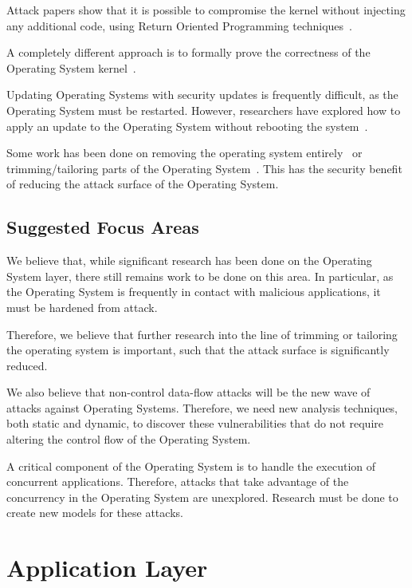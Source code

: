 \documentclass[11pt,letterpaper]{article}
\begin{document}
Attack papers show that it is possible to compromise the kernel
without injecting any additional code, using Return Oriented
Programming techniques~\cite{Hund2009}.

A completely different approach is to formally prove the correctness
of the Operating System kernel~\cite{Klein2009}.

Updating Operating Systems with security updates is frequently
difficult, as the Operating System must be restarted. However,
researchers have explored how to apply an update to the Operating
System without rebooting the system~\cite{Arnold2009}.

Some work has been done on removing the operating system
entirely~\cite{Madhavapeddy2010} or trimming/tailoring parts of the
Operating System~\cite{Kurmus2011, Madhavapeddy2013, Howell2013,
  Kurmus2013, Kurmus2014}. This has the security benefit of reducing
the attack surface of the Operating System.

\subsection{Suggested Focus Areas}

We believe that, while significant research has been done on the
Operating System layer, there still remains work to be done on this
area. In particular, as the Operating System is frequently in contact
with malicious applications, it must be hardened from attack.

Therefore, we believe that further research into the line of trimming
or tailoring the operating system is important, such that the attack
surface is significantly reduced.

We also believe that non-control data-flow attacks will be the new
wave of attacks against Operating Systems. Therefore, we need new
analysis techniques, both static and dynamic, to discover these
vulnerabilities that do not require altering the control flow of the
Operating System.

A critical component of the Operating System is to handle the
execution of concurrent applications. Therefore, attacks that take
advantage of the concurrency in the Operating System are unexplored.
Research must be done to create new models for these attacks. 

\section{Application Layer}
\end{document}
